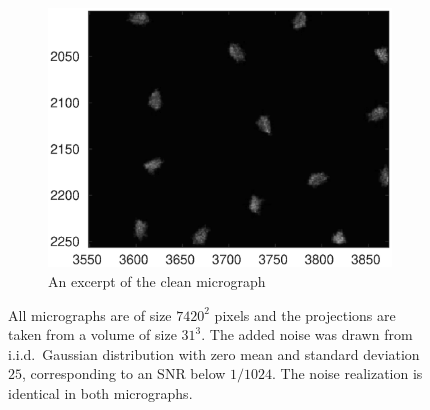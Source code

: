 \documentclass[9pt,twocolumn,twoside,lineno]{pnas-new}
\begin{document}
\begin{figure}[t!]
	\begin{subfigure}[t]{0.3\textwidth}
		\centering
		\includegraphics[scale=0.4]{clean_micrograph_cutout.eps}
		\caption{An excerpt of the clean micrograph}
	\end{subfigure}
	\caption{\label{fig:cryo_detection} All micrographs are of size $7420^2$ pixels and the projections are taken from a volume of size $31^3$. The added noise was drawn from i.i.d.\ Gaussian distribution with zero mean and standard deviation $25$, corresponding to an SNR below $1/1024$.  
		The noise realization is identical in both micrographs.  } 
\end{figure}
\end{document}
